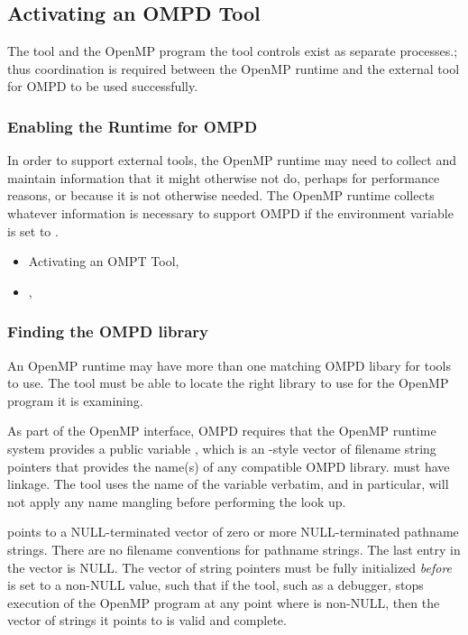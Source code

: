 \subsection{Activating an OMPD Tool}
\label{subsec:activating}

The tool and the OpenMP program the tool controls
exist as separate processes.; thus coordination is required between the OpenMP runtime
and the external tool for OMPD to be used successfully.

\subsubsection{Enabling the Runtime for OMPD}
\label{subsubsec:enabling-ompd}

In order to support external tools, the OpenMP runtime may need to collect
and maintain information that it might otherwise not do, perhaps
for performance reasons, or because it is not otherwise needed.
The OpenMP runtime collects whatever information is necessary
to support OMPD if the environment variable  is set to .

\crossreferences
\begin{itemize}
\item
  Activating an OMPT Tool, 
\item
  , 
\end{itemize}

\subsubsection{Finding the OMPD library}
\label{subsubsec:finding-the-ompd}

An OpenMP runtime may have more than one matching OMPD libary for
tools to use.
The tool must be able to locate the right library to use
for the OpenMP program it is examining.

As part of the OpenMP interface, OMPD requires that the OpenMP
runtime system provides a public variable ,
which is an -style vector of filename string pointers that
provides the name(s) of any compatible OMPD library.
 must have  linkage.
The tool uses the name of the variable verbatim,
and in particular, will not apply any name mangling before
performing the look up.

 points to a NULL-terminated
vector of zero or more NULL-terminated pathname strings.
There are no filename conventions for pathname strings.
The last entry in the vector is NULL.
The vector of string pointers must be fully initialized \emph{before}
 is set to a non-NULL value,
such that if the tool, such as a debugger,
stops execution of the OpenMP program at any point where
 is non-NULL,
then the vector of strings it points to is valid and complete.

